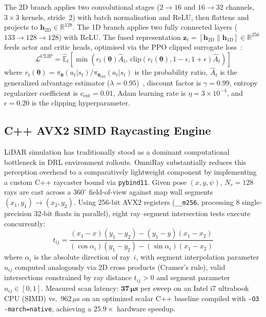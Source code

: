 \documentclass[conference]{IEEEtran}
\begin{document}
The 2D branch applies two convolutional stages ($2\!\to\!16$ and $16\!\to\!32$ channels, $3\!\times\!3$ kernels, stride~2) with batch normalisation and ReLU, then flattens and projects to $\mathbf{h}_{\text{2D}} \in \mathbb{R}^{128}$.
The 1D branch applies two fully connected layers ($133 \to 128 \to 128$) with ReLU.
The fused representation $\mathbf{z}_t = [\mathbf{h}_{\text{2D}} \| \mathbf{h}_{\text{1D}}] \in \mathbb{R}^{256}$ feeds actor and critic heads, optimised via the PPO clipped surrogate loss~\cite{schulman2017}:
\begin{equation}
\label{eq:clip}
\mathcal{L}^{\text{CLIP}} = \hat{\mathbb{E}}_t \!\left[\min\!\left(r_t(\boldsymbol{\theta})\hat{A}_t,\, \text{clip}(r_t(\boldsymbol{\theta}), 1\!-\!\epsilon, 1\!+\!\epsilon)\hat{A}_t\right)\right]
\end{equation}
where $r_t(\boldsymbol{\theta}) = \pi_{\boldsymbol{\theta}}(a_t|s_t) / \pi_{\boldsymbol{\theta}_{\text{old}}}(a_t|s_t)$ is the probability ratio, $\hat{A}_t$ is the generalized advantage estimator ($\lambda = 0.95$)~\cite{schulman2016gae}, discount factor is $\gamma = 0.99$, entropy regularizer coefficient is $c_{\text{ent}} = 0.01$, Adam learning rate is $\eta = 3 \times 10^{-4}$, and $\epsilon = 0.20$ is the clipping hyperparameter.

\subsection{C++ AVX2 SIMD Raycasting Engine}
LiDAR simulation has traditionally stood as a dominant computational bottleneck in DRL environment rollouts. OmniRay substantially reduces this perception overhead to a comparatively lightweight component by implementing a custom C++ raycaster bound via \texttt{pybind11}. Given pose $(x, y, \psi)$, $N_r\!=\!128$ rays are cast across a $360^\circ$ field-of-view against map wall segments $(x_1, y_1) \to (x_2, y_2)$.
Using 256-bit AVX2 registers (\texttt{\_\_m256}, processing 8 single-precision 32-bit floats in parallel), eight ray--segment intersection tests execute concurrently:
\begin{equation}
\label{eq:ray_intersect}
t_{ij} = \frac{(x_1\!-\!x)(y_1\!-\!y_2) - (y_1\!-\!y)(x_1\!-\!x_2)}{(\cos\alpha_i)(y_1\!-\!y_2) - (\sin\alpha_i)(x_1\!-\!x_2)}
\end{equation}
where $\alpha_i$ is the absolute direction of ray~$i$, with segment interpolation parameter $u_{ij}$ computed analogously via 2D cross products (Cramer's rule), valid intersections constrained by ray distance $t_{ij} > 0$ and segment parameter $u_{ij} \in [0, 1]$.
Measured scan latency: $\mathbf{37\,\mu}$\textbf{s} per sweep on an Intel i7 ultrabook CPU (SIMD) vs.\ $962\,\mu$s on an optimized scalar C++ baseline compiled with \texttt{-O3 -march=native}, achieving a $25.9\times$ hardware speedup.
\end{document}
